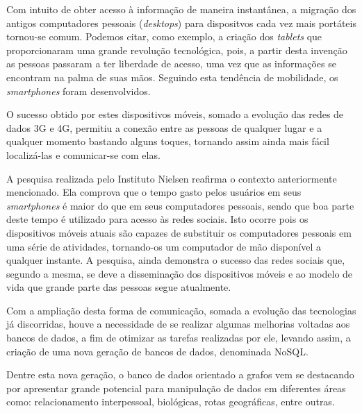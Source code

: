 \par Com intuito de obter acesso à informação de maneira instantânea, a migração dos antigos computadores pessoais (\textit{desktops}) para dispositvos cada vez mais portáteis tornou-se comum. Podemos citar, como exemplo, a criação dos \textit{tablets} que proporcionaram uma grande revolução tecnológica, pois, a partir desta invenção as pessoas passaram a ter liberdade de acesso, uma vez que as informações se encontram na palma de suas mãos. Seguindo esta tendência de mobilidade, os \textit{smartphones} foram desenvolvidos.

\par O sucesso obtido por estes dispositivos móveis, somado a evolução das redes de dados 3G e 4G, permitiu a conexão entre as pessoas de qualquer lugar e a qualquer momento bastando alguns toques, tornando assim ainda mais fácil localizá-las e comunicar-se com elas.

\par A pesquisa realizada pelo Instituto Nielsen reafirma o contexto anteriormente mencionado. Ela comprova que o tempo gasto pelos usuários em seus \textit{smartphones} é maior do que em seus computadores pessoais, sendo que boa parte deste tempo é utilizado para acesso às redes sociais. Isto ocorre pois os dispositivos móveis atuais são capazes de substituir os computadores pessoais em uma série de atividades, tornando-os um computador de mão disponível a qualquer instante. A pesquisa, ainda demonstra o sucesso das redes sociais que, segundo a mesma, se deve a disseminação dos dispositivos móveis e ao modelo de vida que grande parte das pessoas segue atualmente.

\par Com a ampliação desta forma de comunicação, somada a evolução das tecnologias já discorridas, houve a necessidade de se realizar algumas melhorias voltadas aos bancos de dados, a fim de otimizar as tarefas realizadas por ele, levando assim, a criação de uma nova geração de bancos de dados, denominada NoSQL\footnotemark[1].


\par Dentre esta nova geração, o banco de dados orientado a grafos vem se destacando por apresentar grande potencial para manipulação de dados em diferentes áreas como: relacionamento interpessoal, biológicas, rotas geográficas, entre outras.


